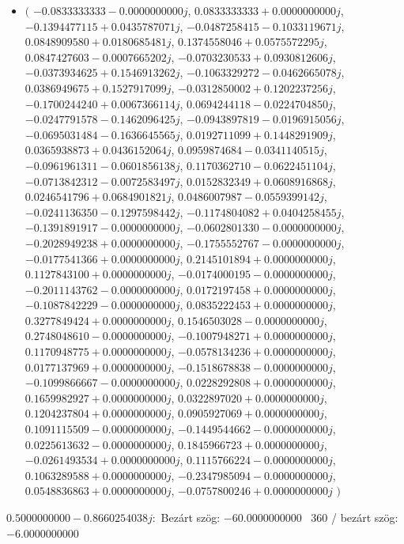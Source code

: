 \documentclass[14pt,a4paper]{article}
\begin{document}
\begin{itemize}
\item
$\big($
$-0.0833333333-0.0000000000j$, $0.0833333333+0.0000000000j$, $-0.1394477115+0.0435787071j$, $-0.0487258415-0.1033119671j$, $0.0848909580+0.0180685481j$, $0.1374558046+0.0575572295j$, $0.0847427603-0.0007665202j$, $-0.0703230533+0.0930812606j$, $-0.0373934625+0.1546913262j$, $-0.1063329272-0.0462665078j$, $0.0386949675+0.1527917099j$, $-0.0312850002+0.1202237256j$, $-0.1700244240+0.0067366114j$, $0.0694244118-0.0224704850j$, $-0.0247791578-0.1462096425j$, $-0.0943897819-0.0196915056j$, $-0.0695031484-0.1636645565j$, $0.0192711099+0.1448291909j$, $0.0365938873+0.0436152064j$, $0.0959874684-0.0341140515j$, $-0.0961961311-0.0601856138j$, $0.1170362710-0.0622451104j$, $-0.0713842312-0.0072583497j$, $0.0152832349+0.0608916868j$, $0.0246541796+0.0684901821j$, $0.0486007987-0.0559399142j$, $-0.0241136350-0.1297598442j$, $-0.1174804082+0.0404258455j$, $-0.1391891917-0.0000000000j$, $-0.0602801330-0.0000000000j$, $-0.2028949238+0.0000000000j$, $-0.1755552767-0.0000000000j$, $-0.0177541366+0.0000000000j$, $0.2145101894+0.0000000000j$, $0.1127843100+0.0000000000j$, $-0.0174000195-0.0000000000j$, $-0.2011143762-0.0000000000j$, $0.0172197458+0.0000000000j$, $-0.1087842229-0.0000000000j$, $0.0835222453+0.0000000000j$, $0.3277849424+0.0000000000j$, $0.1546503028-0.0000000000j$, $0.2748048610-0.0000000000j$, $-0.1007948271+0.0000000000j$, $0.1170948775+0.0000000000j$, $-0.0578134236+0.0000000000j$, $0.0177137969+0.0000000000j$, $-0.1518678838-0.0000000000j$, $-0.1099866667-0.0000000000j$, $0.0228292808+0.0000000000j$, $0.1659982927+0.0000000000j$, $0.0322897020+0.0000000000j$, $0.1204237804+0.0000000000j$, $0.0905927069+0.0000000000j$, $0.1091115509-0.0000000000j$, $-0.1449544662-0.0000000000j$, $0.0225613632-0.0000000000j$, $0.1845966723+0.0000000000j$, $-0.0261493534+0.0000000000j$, $0.1115766224-0.0000000000j$, $0.1063289588+0.0000000000j$, $-0.2347985094-0.0000000000j$, $0.0548836863+0.0000000000j$, $-0.0757800246+0.0000000000j$
$\big)$
\end{itemize}
$0.5000000000-0.8660254038j$:\
Bezárt szög: $-60.0000000000$ \
360 / bezárt szög: $-6.0000000000$\
\end{document}
